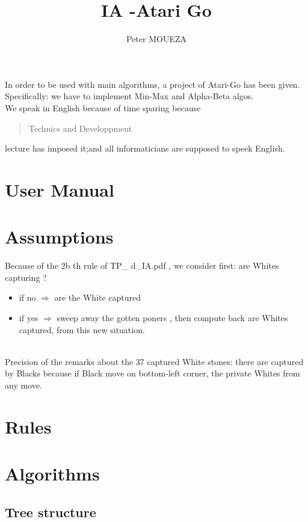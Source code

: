 \documentclass{book}
\newcommand{\tmtextbf}[1]{{\bfseries{#1}}}
\begin{document}
\title{IA -Atari Go}
\author{Peter MOUEZA}
\maketitle


In order to be used with main algorithms, a project of Atari-Go has been given.
Specifically: we have to implement Min-Max  and Alpha-Beta algos.\\
We speak in English because of time sparing because \begin{quotation}
Technics and Developpment
\end{quotation} lecture has imposed it;and all informaticians are supposed to speek English.


\chapter{User Manual}

\chapter{Assumptions}
Because of the 2b th rule of 
TP\_
d\_IA.pdf , we consider first: are Whites capturing 
?\\
\begin{itemize}
\item if no 
$
\Rightarrow
$
are the White captured
\item if yes 
$
\Rightarrow
$
sweep away the gotten poners , then compute back are Whites captured, from this new situation.
\end{itemize}
\\
Precision of the remarks about the 37 captured White stones: there are captured by Blacks because if Black move on bottom-left corner, the private Whites from any move.
\chapter{Rules}
\chapter{Algorithms}

\section{Tree structure}
\end{document}
